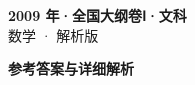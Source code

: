 \documentclass[zihao=-4, a4paper]{ctexart}
\begin{document}
\begin{center}
  {\Large\bfseries 2009 年·全国大纲卷Ⅰ·文科}\\[4pt]
  {\large 数学 · 解析版}
\end{center}
\medskip
{}

\clearpage
{}
\begin{center}{\Large\bfseries 参考答案与详细解析}\end{center}
\medskip

\end{document}
